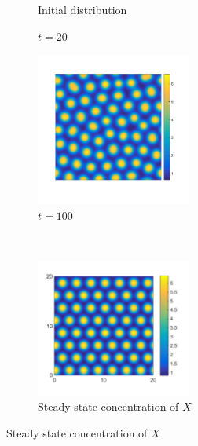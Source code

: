 \begin{figure}
	\centering
	\begin{subfigure}{0.31\textwidth}
		\centering
		\caption{Initial distribution}
		\label{fig:spots-u-00}
	\end{subfigure}
	\begin{subfigure}{0.31\textwidth}
		\centering
		\caption{$t=20$}
		\label{fig:spots-u-20}
	\end{subfigure}
	\begin{subfigure}{0.35\textwidth}
		\centering
		\includegraphics[width=2in]{13.pde1/spots-u-100.pdf}
		\caption{$t=100$}
		\label{fig:spots-u-100}
	\end{subfigure}
\\
\vspace{0.2in}
	\begin{subfigure}{0.45\textwidth}
		\centering
		\includegraphics[width=2in]{13.pde1/spots-u.pdf}
		\caption{Steady state concentration of $X$}	
		\label{fig:spots-u}
	\end{subfigure}

\end{figure}
